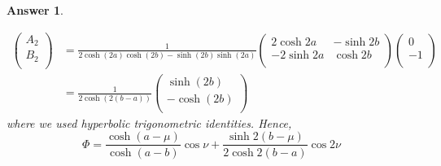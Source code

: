 \documentclass[a4paper]{article}
\newtheorem{ans}{Answer}[section]
\theoremstyle{new}
\begin{document}
\begin{ans}
\begin{enumerate}[label=(\alph*)]
\begin{align}
\begin{pmatrix}A_2\\B_2\\\end{pmatrix}&=\frac{1}{2\cosh(2a)\cosh(2b)-\sinh(2b)\sinh(2a)}\begin{pmatrix}2\cosh 2a&-\sinh 2b\\-2\sinh 2a&\cosh 2b\\\end{pmatrix}\begin{pmatrix}0\\-1\\\end{pmatrix}\nonumber\\&=\frac{1}{2\cosh(2(b-a))}\begin{pmatrix}\sinh(2b)\\-\cosh(2b)\\\end{pmatrix}\nonumber
\end{align}
where we used hyperbolic trigonometric identities. Hence,
$$\Phi=\frac{\cosh(a-\mu)}{\cosh(a-b)}\cos\nu+\frac{\sinh2(b-\mu)}{2\cosh2(b-a)}\cos 2\nu$$
\end{enumerate}
\end{ans}
\end{document}
